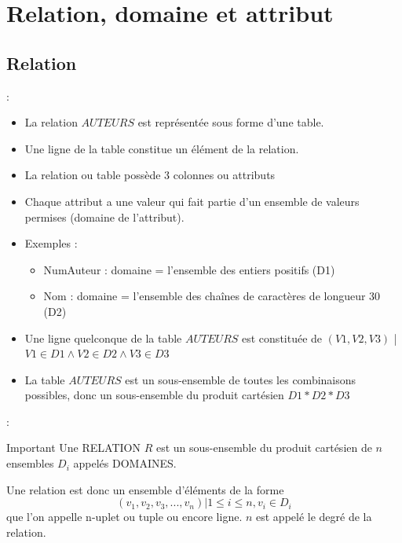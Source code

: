 \documentclass[10pt]{beamer}
\begin{document}
\section{Relation, domaine et attribut}
\tocss
\subsection{Relation}

\begin{frame}{\secname : \subsecname}
    \begin{itemize}
        \item La relation $AUTEURS$ est représentée sous forme d’une table.
        \item Une ligne de la table constitue un élément de la relation.
        \item La relation ou table possède 3 colonnes ou attributs
        \item Chaque attribut a une valeur qui fait partie d’un ensemble de valeurs permises (domaine de l’attribut).
        \item Exemples :
              \begin{itemize}
                  \item NumAuteur : domaine = l’ensemble des entiers positifs (D1)
                  \item Nom : domaine = l’ensemble des chaînes de caractères de longueur 30 (D2)
              \end{itemize}
        \item Une ligne quelconque de la table $AUTEURS$ est constituée de $(V1, V2, V3)$ | $V1 \in D1 \land V2 \in D2 \land V3 \in D3$
        \item La table $AUTEURS$ est un sous-ensemble de toutes les combinaisons possibles, donc un sous-ensemble du produit cartésien $D1 * D2 * D3$
    \end{itemize}
\end{frame}

\begin{frame}{\secname : \subsecname}
    \begin{alertblock}{Important}
        Une RELATION $R$ est un sous-ensemble du produit cartésien de $n$ ensembles $D_i$ appelés DOMAINES.
    \end{alertblock}
    Une relation est donc un ensemble d’éléments de la forme
    $$
        (v_1,v_2,v_3,..., v_n) | 1\leq i \leq n, v_i \in D_i
    $$
    que l’on appelle n-uplet ou tuple ou encore ligne. $n$ est appelé le degré de la relation.
\end{frame}
\end{document}
